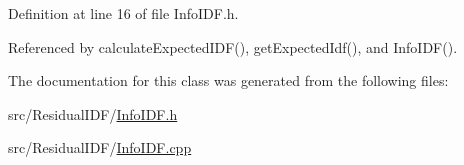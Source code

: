 \-Definition at line 16 of file \-Info\-I\-D\-F.\-h.



\-Referenced by calculate\-Expected\-I\-D\-F(), get\-Expected\-Idf(), and \-Info\-I\-D\-F().



\-The documentation for this class was generated from the following files\-:\begin{DoxyCompactItemize}
\item 
src/\-Residual\-I\-D\-F/\hyperlink{InfoIDF_8h}{\-Info\-I\-D\-F.\-h}\item 
src/\-Residual\-I\-D\-F/\hyperlink{InfoIDF_8cpp}{\-Info\-I\-D\-F.\-cpp}\end{DoxyCompactItemize}

